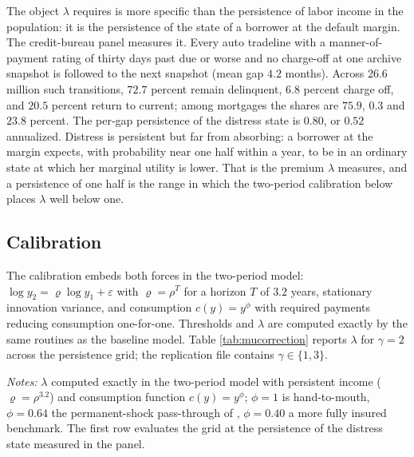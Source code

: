 \documentclass[12pt,english]{article}
\begin{document}
The object $\lambda$ requires is more specific than the persistence of labor income in the population: it is the persistence of the state of a borrower at the default margin. The credit-bureau panel measures it. Every auto tradeline with a manner-of-payment rating of thirty days past due or worse and no charge-off at one archive snapshot is followed to the next snapshot (mean gap $4.2$ months). Across 26.6 million such transitions, $72.7$ percent remain delinquent, $6.8$ percent charge off, and $20.5$ percent return to current; among mortgages the shares are $75.9$, $0.3$ and $23.8$ percent. The per-gap persistence of the distress state is $0.80$, or $0.52$ annualized. Distress is persistent but far from absorbing: a borrower at the margin expects, with probability near one half within a year, to be in an ordinary state at which her marginal utility is lower. That is the premium $\lambda$ measures, and a persistence of one half is the range in which the two-period calibration below places $\lambda$ well below one.

\subsection{Calibration}

The calibration embeds both forces in the two-period model: $\log y_2 = \varrho \log y_1 + \varepsilon$ with $\varrho = \rho^{T}$ for a horizon $T$ of $3.2$ years, stationary innovation variance, and consumption $c(y) = y^{\phi}$ with required payments reducing consumption one-for-one. Thresholds and $\lambda$ are computed exactly by the same routines as the baseline model. Table \ref{tab:mucorrection} reports $\lambda$ for $\gamma = 2$ across the persistence grid; the replication file contains $\gamma \in \{1, 3\}$.

\begin{table}[H]
\centering
\caption{The marginal-utility ratio $\lambda$ in the two-period calibration ($\gamma = 2$)}
\label{tab:mucorrection}


\vspace{0.5em}
\noindent \small \textit{Notes:} $\lambda$ computed exactly in the two-period model with persistent income ($\varrho = \rho^{3.2}$) and consumption function $c(y)=y^{\phi}$; $\phi = 1$ is hand-to-mouth, $\phi = 0.64$ the permanent-shock pass-through of \citet{blundell_consumption_2008}, $\phi = 0.40$ a more fully insured benchmark. The first row evaluates the grid at the persistence of the distress state measured in the panel.
\end{table}
\end{document}
